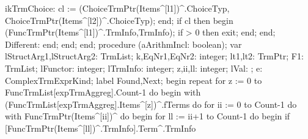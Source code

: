                   ikTrmChoice:
                     cl := (ChoiceTrmPtr(Items^[l1])^.ChoiceTyp,
                                  ChoiceTrmPtr(Items^[l2])^.ChoiceTyp);
               end;
               if cl then
               begin
                  (FuncTrmPtr(Items^[l1])^.TrmInfo,TrmInfo);
                  if  > 0 then exit;
               end;
            end;
            Different:
         end;
      end;
end;
\eatline
{}\nwendcode{}\nwdocspar
\nwenddocs{}\endmoddef\nwstartdeflinemarkup\nwenddeflinemarkup
procedure (aArithmIncl: boolean);
var
   lStructArg1,lStructArg2: TrmList;
   k,EqNr1,EqNr2: integer;
   lt1,lt2: TrmPtr;
   F1: TrmList;
   lFunctor: integer;
   lTrmInfo: integer;
   z,ii,ll: integer;
   lVal: ;
   e: ComplexTrmExprKind;
label Found,Next;
begin
   repeat
      for z := 0 to FuncTrmList[expTrmAggreg].Count-1 do
      begin
         with (FuncTrmList[expTrmAggreg].Items^[z])^.fTerms do
            for ii := 0 to Count-1 do
               with FuncTrmPtr(Items^[ii])^ do
            begin
               for ll := ii+1 to Count-1 do
               begin
                  if [FuncTrmPtr(Items^[ll])^.TrmInfo].Term^.TrmInfo
